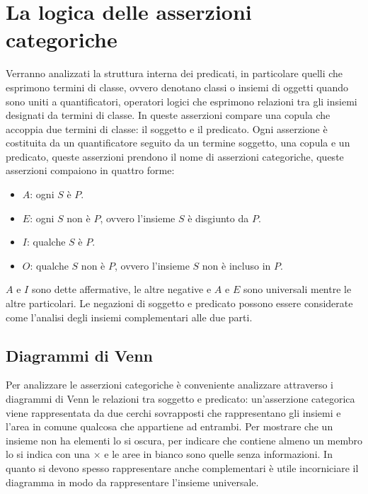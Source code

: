 \chapter{La logica delle asserzioni categoriche}
Verranno analizzati la struttura interna dei predicati, in particolare quelli che esprimono termini di classe, ovvero denotano classi o insiemi di oggetti quando sono uniti a quantificatori, operatori logici che 
esprimono relazioni tra gli insiemi designati da termini di classe. In queste asserzioni compare una copula che accoppia due termini di classe: il soggetto e il predicato.  Ogni asserzione \`e costituita da un 
quantificatore seguito da un termine soggetto, una copula e un predicato, queste asserzioni prendono il nome di asserzioni categoriche, queste asserzioni compaiono in quattro forme:
\begin{itemize}
\item $A$: ogni $S$ \`e $P$.
\item $E$: ogni $S$ non \`e $P$, ovvero l'insieme $S$ \`e disgiunto da $P$.
\item $I$: qualche $S$ \`e $P$.
\item $O$: qualche $S$ non \`e $P$, ovvero l'insieme $S$ non \`e incluso in $P$.
\end{itemize}
$A$ e $I$ sono dette affermative, le altre negative e $A$ e $E$ sono universali mentre le altre particolari. Le negazioni di soggetto e predicato possono essere considerate come l'analisi degli insiemi 
complementari alle due parti. 
\section{Diagrammi di Venn}
Per analizzare le asserzioni categoriche \`e conveniente analizzare attraverso i diagrammi di Venn le relazioni tra soggetto e predicato: un'asserzione categorica viene rappresentata da due cerchi sovrapposti che 
rappresentano gli insiemi e l'area in comune qualcosa che appartiene ad entrambi. Per mostrare che un insieme non ha elementi lo si oscura, per indicare che contiene almeno un membro lo si indica con una $
\times$ e le aree in bianco sono quelle senza informazioni. In quanto si devono spesso rappresentare anche complementari \`e utile incorniciare il diagramma in modo da rappresentare 
l'insieme universale. 
